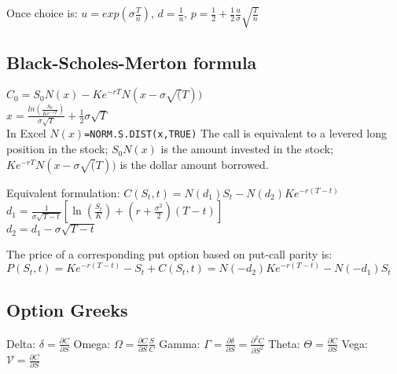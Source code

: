 Once choice is:  $u=exp(\sigma \frac{T}{n})$, $d=\frac{1}{u}$, $p=\frac{1}{2} + \frac{1}{2} \frac{u}{\sigma} \sqrt{\frac{T}{n}}$

\subsection*{Black-Scholes-Merton formula}

$C_0 = S_0 N(x) - K e^{-rT} N (x-\sigma \sqrt(T))$ \\
$x = \frac{ln(\frac{S_0}{K e^{-rT}})}{\sigma \sqrt{T}} + \frac{1}{2} \sigma \sqrt{T}$ \\

In Excel \texttt{$N(x)$=NORM.S.DIST(x,TRUE)}
The call is equivalent to a levered long position in the stock;
 $S_0 N(x) $ is the amount invested in the stock;
$K e^{-rT} N (x-\sigma \sqrt(T))$ is the dollar amount borrowed.

Equivalent formulation:
$ C(S_t, t) = N(d_1)S_t - N(d_2)Ke^{-r(T - t)} $ \\
$ d_1 = \frac{1}{\sigma\sqrt{T - t}}\left[\ln\left(\frac{S_t}{K}\right) + \left(r + \frac{\sigma^2}{2}\right)(T - t)\right] $\\
$ d_2 = d_1 - \sigma\sqrt{T - t} $ 

The price of a corresponding put option based on put-call parity  is:
$ P(S_t, t) = Ke^{-r(T - t)} - S_t + C(S_t, t) =  N(-d_2) Ke^{-r(T - t)} - N(-d_1) S_t $

\subsection*{Option Greeks}

Delta: $\delta = \frac{\partial C}{\partial S}$
Omega: $\Omega = \frac{\partial C}{\partial S} \frac{S}{C}$
Gamma: $\Gamma = \frac{\partial \delta}{\partial S} = \frac{\partial^2 C}{\partial S^2} $
Theta: $\Theta = \frac{\partial C}{\partial S}$
Vega:  $\mathcal{V} = \frac{\partial C}{\partial S}$

